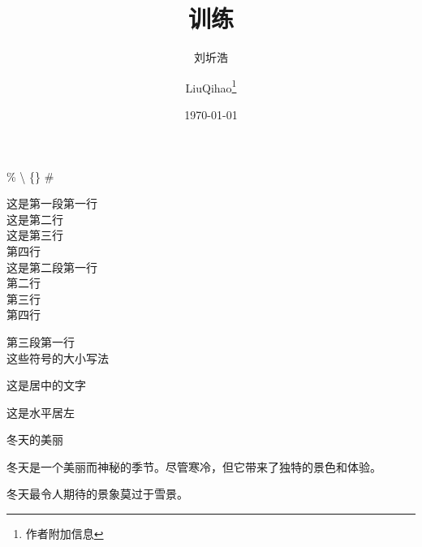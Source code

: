 \documentclass{article} %
\title{训练} %
\author{刘圻浩 \and LiuQihao\thanks{作者附加信息}} %
\date{\today} %
\begin{document}
\maketitle %

\% %
\textbackslash %
\{\} %
\# %

这是第一段第一行\\
这是第二行\\
这是第三行\\
第四行\\

这是第二段第一行\\ %
第二行\\
第三行\\
第四行\par %
第三段第一行\\
这些符号的大小\hspace{1em}写法\\ %
\begin{center} %
    这是居中的文字
\end{center}
\begin{flushleft}
    这是水平居左
\end{flushleft}\par
\begin{center}
冬天的美丽   
\end{center}\par
冬天是一个美丽而神秘的季节。尽管寒冷，但它带来了独特的景色和体验。
\begin{flushright}
冬天最令人期待的景象莫过于雪景。
\end{flushright}\par
\end{document}
